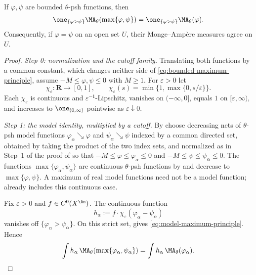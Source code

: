 \begin{theorem}
\label{thm:bounded-maximum-principle}
If $\varphi,\psi$ are bounded $\theta$-psh functions, then
\begin{equation}
\label{eq:bounded-maximum-principle}
 \one_{\{\varphi>\psi\}}\MA_\theta(\max\{\varphi,\psi\})
 =\one_{\{\varphi>\psi\}}\MA_\theta(\varphi).
\end{equation}
Consequently, if $\varphi=\psi$ on an open set $U$, their
Monge--Amp\`ere measures agree on $U$.
\end{theorem}

\begin{proof}
\emph{Step 0: normalization and the cutoff family.}  Translating both
functions by a common constant, which changes neither side of
\eqref{eq:bounded-maximum-principle}, assume $-M\leq\varphi,\psi\leq0$ with
$M\geq1$.  For $\varepsilon>0$ let
\[
 \chi_\varepsilon:\mathbf R\to[0,1],\qquad
 \chi_\varepsilon(s)=\min\{1,\max\{0,s/\varepsilon\}\} .
\]
Each $\chi_\varepsilon$ is continuous and $\varepsilon^{-1}$-Lipschitz,
vanishes on $(-\infty,0]$, equals $1$ on $[\varepsilon,\infty)$, and
increases to $\one_{(0,\infty)}$ pointwise as
$\varepsilon\downarrow0$.

\emph{Step 1: the model identity, multiplied by a cutoff.}  By
 choose decreasing nets of
$\theta$-psh model functions $\varphi_\alpha\searrow\varphi$ and
$\psi_\alpha\searrow\psi$ indexed by a common directed set, obtained by
taking the product of the two index sets, and normalized as in Step~1 of the
proof of  so that
$-M\leq\varphi\leq\varphi_\alpha\leq0$ and
$-M\leq\psi\leq\psi_\alpha\leq0$.  The functions
$\max\{\varphi_\alpha,\psi_\alpha\}$ are continuous $\theta$-psh
functions by  and decrease to
$\max\{\varphi,\psi\}$.  A maximum of real model functions need not
be a model function;  already includes
this continuous case.

Fix $\varepsilon>0$ and $f\in C^0(X^{\An})$.  The continuous function
\[
 h_\alpha:=f\cdot\chi_\varepsilon(\varphi_\alpha-\psi_\alpha)
\]
vanishes off $\{\varphi_\alpha>\psi_\alpha\}$.  On this strict set,
 gives
\eqref{eq:model-maximum-principle}.  Hence
\begin{equation}
\label{eq:ch25-max-model-tested}
 \int h_\alpha\,\MA_\theta(\max\{\varphi_\alpha,\psi_\alpha\})
 =\int h_\alpha\,\MA_\theta(\varphi_\alpha) .
\end{equation}


\end{proof}
